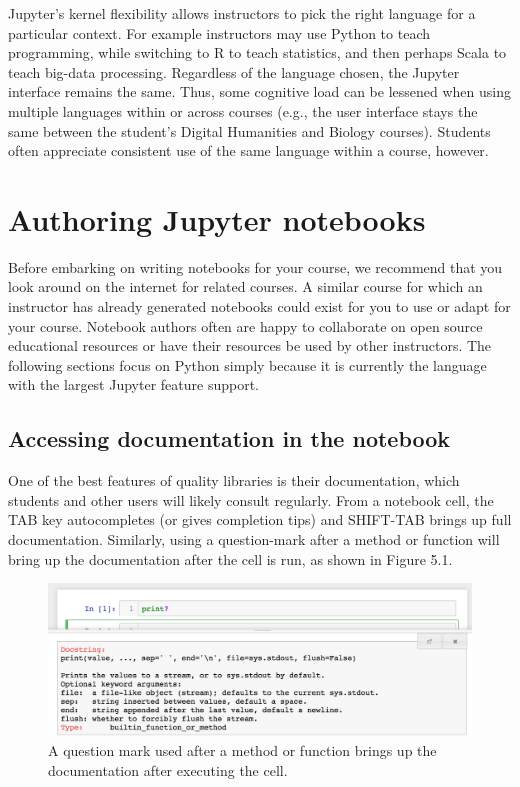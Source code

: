 \documentclass[]{book}
\begin{document}
Jupyter's kernel flexibility allows instructors to pick the right
language for a particular context. For example instructors may use
Python to teach programming, while switching to R to teach statistics,
and then perhaps Scala to teach big-data processing. Regardless of the
language chosen, the Jupyter interface remains the same. Thus, some
cognitive load can be lessened when using multiple languages within or
across courses (e.g., the user interface stays the same between the
student's Digital Humanities and Biology courses). Students often
appreciate consistent use of the same language within a course, however.

\section{Authoring Jupyter notebooks}\label{authoring-jupyter-notebooks}

Before embarking on writing notebooks for your course, we recommend that
you look around on the internet for related courses. A similar course
for which an instructor has already generated notebooks could exist for
you to use or adapt for your course. Notebook authors often are happy to
collaborate on open source educational resources or have their resources
be used by other instructors. The following sections focus on Python
simply because it is currently the language with the largest Jupyter
feature support.

\subsection{Accessing documentation in the
notebook}\label{accessing-documentation-in-the-notebook}

One of the best features of quality libraries is their documentation,
which students and other users will likely consult regularly. From a
notebook cell, the TAB key autocompletes (or gives completion tips) and
SHIFT-TAB brings up full documentation. Similarly, using a question-mark
after a method or function will bring up the documentation after the
cell is run, as shown in Figure 5.1.

\begin{figure}
\centering
\includegraphics{images/chapter50.png}
\caption{A question mark used after a method or function brings up the
documentation after executing the cell.}
\end{figure}
\end{document}
